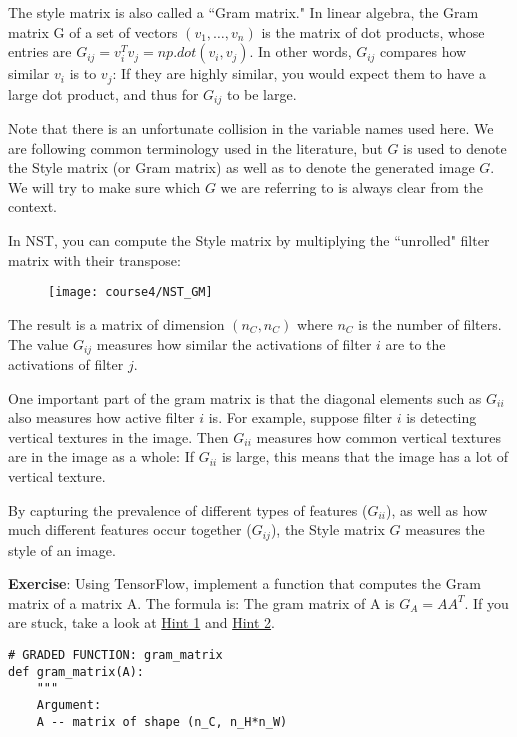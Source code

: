 {The style matrix is also called a ``Gram matrix." In linear algebra, the Gram matrix G of a set of vectors $(v_{1},\dots ,v_{n})$ is the matrix of dot products, whose entries are ${\displaystyle G_{ij} = v_{i}^T v_{j} = np.dot(v_{i}, v_{j})  }$. In other words, $G_{ij}$ compares how similar $v_i$ is to $v_j$: If they are highly similar, you would expect them to have a large dot product, and thus for $G_{ij}$ to be large. 

Note that there is an unfortunate collision in the variable names used here. We are following common terminology used in the literature, but $G$ is used to denote the Style matrix (or Gram matrix) as well as to denote the generated image $G$. We will try to make sure which $G$ we are referring to is always clear from the context. 

In NST, you can compute the Style matrix by multiplying the ``unrolled" filter matrix with their transpose:
\begin{figure}[h]
\begin{center}
\texttt{[image: course4/NST\_GM]}
\end{center}
\end{figure}


The result is a matrix of dimension $(n_C,n_C)$ where $n_C$ is the number of filters. The value $G_{ij}$ measures how similar the activations of filter $i$ are to the activations of filter $j$. 

One important part of the gram matrix is that the diagonal elements such as $G_{ii}$ also measures how active filter $i$ is. For example, suppose filter $i$ is detecting vertical textures in the image. Then $G_{ii}$ measures how common  vertical textures are in the image as a whole: If $G_{ii}$ is large, this means that the image has a lot of vertical texture. 

By capturing the prevalence of different types of features ($G_{ii}$), as well as how much different features occur together ($G_{ij}$), the Style matrix $G$ measures the style of an image. 

{\textbf{Exercise}}:
Using TensorFlow, implement a function that computes the Gram matrix of a matrix A. The formula is: The gram matrix of A is $G_A = AA^T$. If you are stuck, take a look at \href{https://www.tensorflow.org/api_docs/python/tf/matmul}{Hint 1} and \href{https://www.tensorflow.org/api_docs/python/tf/transpose}{Hint 2}.
\begin{verbatim}
# GRADED FUNCTION: gram_matrix
def gram_matrix(A):
    """
    Argument:
    A -- matrix of shape (n_C, n_H*n_W)
    

\end{verbatim}}

